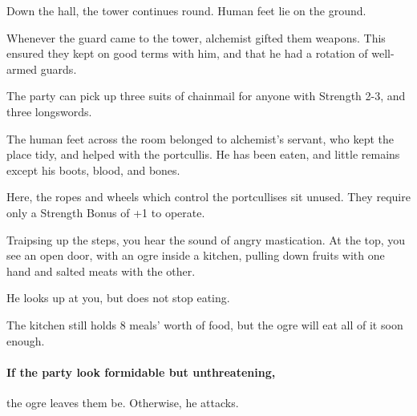 \begin{multicols}{2}
\begin{boxtext}
  Down the hall, the tower continues round.
  Human feet lie on the ground.

\end{boxtext}


\begin{exampletext}
  Whenever the \gls{guard} came to the tower, \gls{alchemist} gifted them weapons.
  This ensured they kept on good terms with him, and that he had a rotation of well-armed guards.
\end{exampletext}


The party can pick up three suits of chainmail for anyone with Strength 2-3, and three longswords.

The human feet across the room belonged to \gls{alchemist}'s servant, who kept the place tidy, and helped with the portcullis.
He has been eaten, and little remains except his boots, blood, and bones.


Here, the ropes and wheels which control the portcullises sit unused.
They require only a Strength Bonus of +1 to operate.

\begin{boxtext}
  Traipsing up the steps, you hear the sound of angry mastication.
  At the top, you see an open door, with an ogre inside a kitchen, pulling down fruits with one hand and salted meats with the other.

  He looks up at you, but does not stop eating.
\end{boxtext}


The kitchen still holds 8 meals' worth of food, but the ogre will eat all of it soon enough.

\paragraph{If the party look formidable but unthreatening,}
the ogre leaves them be.
Otherwise, he attacks.



\end{multicols}
